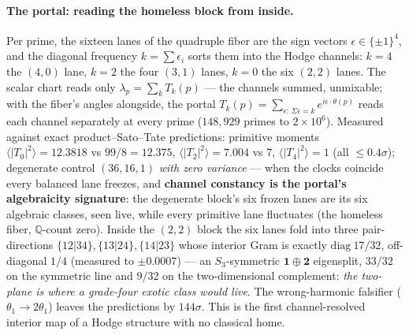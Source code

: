\documentclass[11pt]{article}
\theoremstyle{definition}
\theoremstyle{remark}
\begin{document}
\paragraph{The portal: reading the homeless block from inside.} Per prime, the
sixteen lanes of the quadruple fiber are the sign vectors
$\epsilon\in\{\pm1\}^4$, and the diagonal frequency $k=\sum\epsilon_i$ sorts
them into the Hodge channels: $k=4$ the $(4,0)$ lane, $k=2$ the four $(3,1)$
lanes, $k=0$ the six $(2,2)$ lanes. The scalar chart reads only
$\lambda_p=\sum_kT_k(p)$ --- the channels summed, unmixable; with the fiber's
angles alongside, the portal
$T_k(p)=\sum_{\epsilon:\,\Sigma\epsilon=k}e^{i\epsilon\cdot\theta(p)}$ reads
each channel separately at every prime ($148{,}929$ primes to $2\times10^6$).
Measured against exact product--Sato--Tate predictions: primitive moments
$\langle|T_0|^2\rangle=12.3818$ vs $99/8=12.375$,
$\langle|T_2|^2\rangle=7.004$ vs $7$, $\langle|T_4|^2\rangle=1$ (all
$\le0.4\sigma$); degenerate control $(36,16,1)$ \emph{with zero variance} ---
when the clocks coincide every balanced lane freezes, and \textbf{channel
constancy is the portal's algebraicity signature}: the degenerate block's six
frozen lanes are its six algebraic classes, seen live, while every primitive
lane fluctuates (the homeless fiber, $\mathbb Q$-count zero). Inside the
$(2,2)$ block the six lanes fold into three pair-directions
$\{12|34\},\{13|24\},\{14|23\}$ whose interior Gram is exactly
$\mathrm{diag}\ 17/32$, off-diagonal $1/4$ (measured to $\pm0.0007$) ---
an $S_3$-symmetric $\mathbf 1\oplus\mathbf 2$ eigensplit, $33/32$ on the
symmetric line and $9/32$ on the two-dimensional complement: \emph{the
two-plane is where a grade-four exotic class would live}. The wrong-harmonic
falsifier ($\theta_1\to2\theta_1$) leaves the predictions by $144\sigma$.
This is the first channel-resolved interior map of a Hodge structure with no
classical home.
\end{document}

